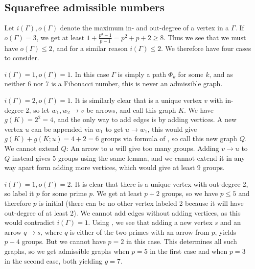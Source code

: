 \documentclass[draft]{article}
\theoremstyle{plain}
\theoremstyle{definition}
\begin{document}
\subsection{Squarefree admissible numbers}
Let $i(\Gamma), o(\Gamma)$ denote the maximum in- and out-degree of a vertex in a \hg[1] $\Gamma$. If $o(\Gamma) = 3$, we get at least $1 + \frac{p^3 - 1}{p - 1} = p^2 + p + 2 \ge 8$. Thus we see that we must have $o(\Gamma) \le 2$, and for a similar reason $i(\Gamma) \le 2$. We therefore have four cases to consider.

 $i(\Gamma) = 1, o(\Gamma) = 1$. In this case $\Gamma$ is simply a path $\Phi_k$ for some $k$, and as neither 6 nor 7 is a Fibonacci number, this is never an admissible graph.

 $i(\Gamma) = 2, o(\Gamma) = 1$. It is similarly clear that is a unique vertex $v$ with in-degree 2, so let $w_1, w_2 \rightarrow v$ be arrows, and call this graph $K$. We have $g(K) = 2^2 = 4$, and the only way to add edges is by adding vertices. A new vertex $u$ can be appended via $w_1$ to get $u \rightarrow w_1$, this would give $g(K) + g(K; u) = 4 + 2 = 6$ groups via formula  of , so call this new graph $Q$. We cannot extend $Q$: An arrow to $u$ will give too many groups. Adding $v \rightarrow u$ to $Q$ instead gives 5 groups using the same lemma, and we cannot extend it in any way apart form adding more vertices, which would give at least 9 groups.

 $i(\Gamma) = 1, o(\Gamma) = 2$. It is clear that there is a unique vertex with out-degree 2, so label it $p$ for some prime $p$. We get at least $p + 2$ groups, so we have $p \le 5$ and therefore $p$ is initial (there can be no other vertex labeled 2 because it will have out-degree of at least 2). We cannot add edges without adding vertices, as this would contradict $i(\Gamma) = 1$. Using , we see that adding a new vertex $s$ and an arrow $q \rightarrow s$, where $q$ is either of the two primes with an arrow from $p$, yields $p + 4$ groups. But we cannot have $p = 2$ in this case. This determines all such graphs, so we get admissible graphs when $p = 5$ in the first case and when $p = 3$ in the second case, both yielding $g = 7$.
\end{document}
